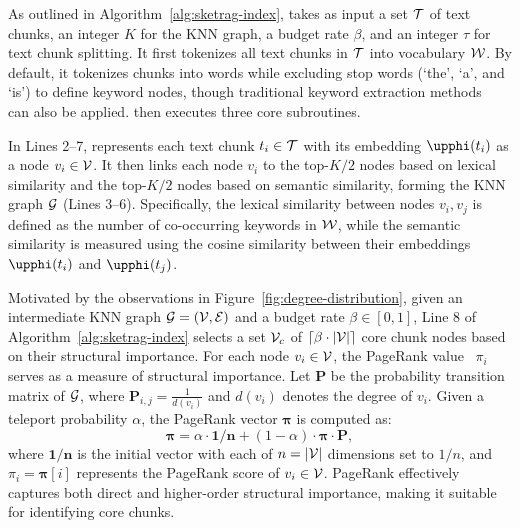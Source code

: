 As outlined in Algorithm~\ref{alg:sketrag-index}, \sketindex takes as input a set $\mathcal{T}$ of text chunks, an integer $K$ for the KNN graph, a budget rate $\beta$, and an integer $\tau$ for text chunk splitting. It first tokenizes all text chunks in $\mathcal{T}$ into vocabulary $\mathcal{W}$. By default, it tokenizes chunks into words while excluding stop words (\eg `the', `a', and `is') to define keyword nodes, though traditional keyword extraction methods~\cite{ramos2003using} can also be applied. \sketindex then executes three core subroutines.

In Lines 2–7, \sketindex represents each text chunk $t_i \in \mathcal{T}$ with its embedding $\temb{t_i}$ as a node $v_i \in \mathcal{V}$. It then links each node $v_i$ to the top-$K/2$ nodes based on lexical similarity and the top-$K/2$ nodes based on semantic similarity, forming the KNN graph $\mathcal{G}$ (Lines 3–6). Specifically, the lexical similarity between nodes $v_i, v_j$ is defined as the number of co-occurring keywords in $\mathcal{W}$, while the semantic similarity is measured using the cosine similarity between their embeddings $\temb{t_i}$ and $\temb{t_j}$.

Motivated by the observations in Figure~\ref{fig:degree-distribution}, given an intermediate KNN graph $\mathcal{G} = (\mathcal{V}, \mathcal{E})$ and a budget rate $\beta \in [0,1]$, Line 8 of Algorithm~\ref{alg:sketrag-index} selects a set $\mathcal{V}_c$ of $\lceil \beta\cdot|\mathcal{V}|\rceil$ core chunk nodes based on their structural importance.
For each node $v_i \in \mathcal{V}$, the PageRank value~\cite{page1999pagerank} $\pi_i$ serves as a measure of structural importance. Let $\mathbf{P}$ be the probability transition matrix of $\mathcal{G}$, where $\mathbf{P}_{i,j} = \frac{1}{d(v_i)}$ and $d(v_i)$ denotes the degree of $v_i$. Given a teleport probability $\alpha$, the PageRank vector $\boldsymbol{\pi}$ is computed as:
\begin{equation}\label{eq:pr}
\boldsymbol{\pi} = \alpha\cdot\mathbf{1/n} + (1-\alpha)\cdot \boldsymbol{\pi} \cdot\mathbf{P},
\end{equation}  
where $\mathbf{1/n}$ is the initial vector with each of $n = |\mathcal{V}|$ dimensions set to $1/n$, and $\pi_i = \boldsymbol{\pi}[i]$ represents the PageRank score of $v_i \in \mathcal{V}$. PageRank effectively captures both direct and higher-order structural importance, making it suitable for identifying core chunks.

